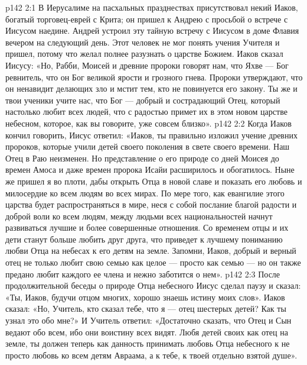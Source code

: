 \vs p142 2:1 В Иерусалиме на пасхальных празднествах присутствовал некий Иаков, богатый торговец\hyp{}еврей с Крита; он пришел к Андрею с просьбой о встрече с Иисусом наедине. Андрей устроил эту тайную встречу с Иисусом в доме Флавия вечером на следующий день. Этот человек не мог понять учения Учителя и пришел, потому что желал полнее разузнать о царстве Божием. Иаков сказал Иисусу: «Но, Рабби, Моисей и древние пророки говорят нам, что Яхве --- Бог ревнитель, что он Бог великой ярости и грозного гнева. Пророки утверждают, что он ненавидит делающих зло и мстит тем, кто не повинуется его закону. Ты же и твои ученики учите нас, что Бог --- добрый и сострадающий Отец, который настолько любит всех людей, что с радостью примет их в этом новом царстве небесном, которое, как вы говорите, уже совсем близко».
\vs p142 2:2 \pc Когда Иаков кончил говорить, Иисус ответил: «Иаков, ты правильно изложил учение древних пророков, которые учили детей своего поколения в свете своего времени. Наш Отец в Раю неизменен. Но представление о его природе со дней Моисея до времен Амоса и даже времен пророка Исайи расширилось и обогатилось. Ныне же пришел я во плоти, дабы открыть Отца в новой славе и показать его любовь и милосердие ко всем людям во всех мирах. По мере того, как евангилие этого царства будет распространяться в мире, неся с собой послание благой радости и доброй воли ко всем людям, между людьми всех национальностей начнут развиваться лучшие и более совершенные отношения. Со временем отцы и их дети станут больше любить друг друга, что приведет к лучшему пониманию любви Отца на небесах к его детям на земле. Запомни, Иаков, добрый и верный отец не только любит свою семью как целое --- просто как семью --- но он также предано любит каждого ее  члена и нежно заботится о нем».
\vs p142 2:3 После продолжительной беседы о природе Отца небесного Иисус сделал паузу и сказал: «Ты, Иаков, будучи отцом многих, хорошо знаешь истину моих слов». Иаков сказал: «Но, Учитель, кто сказал тебе, что я --- отец шестерых детей? Как ты узнал это обо мне?» И Учитель ответил: «Достаточно сказать, что Отец и Сын ведают обо всем, ибо они воистину всех видят. Любя детей своих как отец на земле, ты должен теперь как данность принимать любовь Отца небесного к  не просто любовь ко всем детям Авраама, а к тебе, к твоей отдельно взятой душе».
